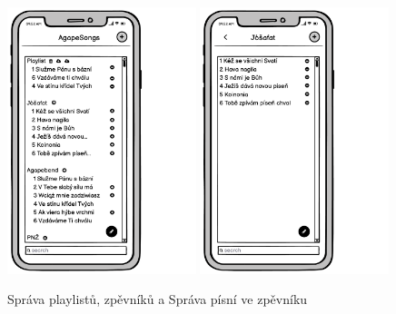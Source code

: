 \begin{figure}
    \includegraphics[width=0.49\textwidth]{images/B-navrh-ui/B-4-sprava-playlistu-zpevniku.pdf}
    \includegraphics[width=0.49\textwidth]{images/B-navrh-ui/B-4-sprava-pisni.pdf}
    \caption{Správa playlistů, zpěvníků a Správa písní ve zpěvníku}
\end{figure}


